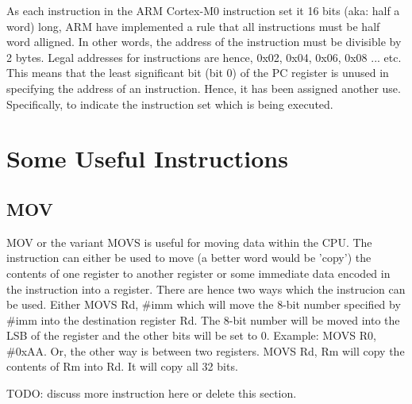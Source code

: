 As each instruction in the ARM Cortex-M0 instruction set it 16 bits (aka: half a word) long, ARM have implemented a rule that all instructions must be half word alligned. In other words, the address of the instruction must be divisible by 2 bytes. Legal addresses for instructions are hence, 0x02, 0x04, 0x06, 0x08 ... etc. 
This means that the least significant bit (bit 0) of the PC register is unused in specifying the address of an instruction. 
Hence, it has been assigned another use. Specifically, to indicate the instruction set which is being executed. 

\section{Some Useful Instructions}
\subsection{MOV}
MOV or the variant MOVS is useful for moving data within the CPU. The instruction can either be used to move (a better word would be 'copy') the contents of one register to another register or some immediate data encoded in the instruction into a register. There are hence two ways which the instrucion can be used. Either MOVS Rd, \#imm which will move the 8-bit number specified by \#imm into the destination register Rd. The 8-bit number will be moved into the LSB of the register and the other bits will be set to 0. Example: MOVS R0, \#0xAA. Or, the other way is between two registers. MOVS Rd, Rm will copy the contents of Rm into Rd. It will copy all 32 bits.

TODO: discuss more instruction here or delete this section. 

